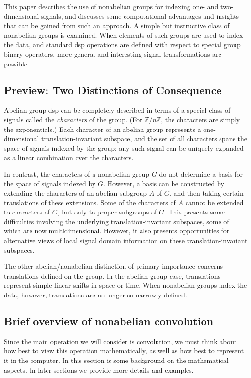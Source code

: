 \documentclass[reqno,onecolumn,oneside]{paper}
\newcommand{\<}{\ensuremath{\langle}}
\renewcommand{\>}{\ensuremath{\rangle}}
\newcommand{\field}[1]{\ensuremath{\mathbb{#1}}}
\newcommand{\Z}{\field{Z}}                   %
\begin{document}
This paper describes the use of nonabelian groups
for indexing one- and two-dimensional signals, and discusses 
some computational advantages and insights that can be gained from 
such an approach. 
A simple but instructive class of 
nonabelian groups 
is examined.  When elements of such
groups are used to index the data, and standard \ac{dsp}
operations are defined with respect to special group
binary operators, more general and interesting
signal transformations are possible.
\subsection{Preview: Two Distinctions of Consequence}
Abelian group \ac{dsp} can be completely described in terms of a
special class of signals called the \emph{characters} of the
group. (For $\Z/n\Z$, the characters are simply the exponentials.)
Each character of an abelian group represents a one-dimensional
translation-invariant subspace, and the set of all characters
spans the space of signals indexed by the group; any such
signal can be uniquely expanded as a linear combination over
the characters.

In contrast, the characters of a nonabelian group $G$
do not determine a basis for the space of signals indexed by
$G$.  However, a basis can be constructed by extending the
characters of an abelian subgroup $A$ of $G$, and then taking
certain translations of these extensions.  Some of the
characters of $A$ cannot be extended to characters of $G$,
but only to proper subgroups of $G$.  This presents some
difficulties involving the underlying translation-invariant
subspaces, some of which are now multidimensional.
However, it also presents opportunities for alternative
views of local signal domain information on these
translation-invariant subspaces. 

The other abelian/nonabelian distinction of primary importance 
concerns translations defined on the group.  In the abelian group
case, translations represent simple linear shifts in space or time.
When nonabelian groups index the data, however, translations are no
longer so narrowly defined. 

\subsection{Brief overview of nonabelian convolution}
Since the main operation we will consider is convolution, we must 
think about how best to view this operation mathematically, as well as how best to
represent it in the computer.  In this section is some background on the
mathematical aspects.  In later sections we provide more details and examples.
\end{document}
